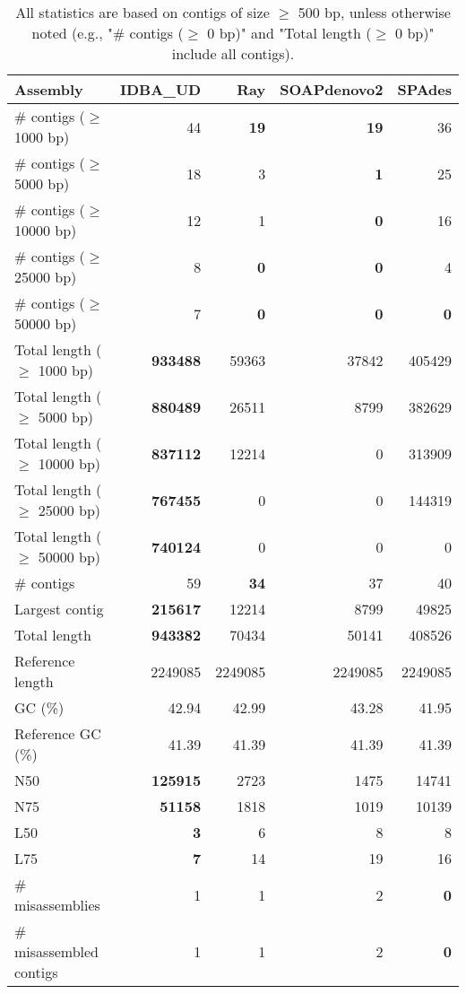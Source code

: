 \documentclass[12pt,a4paper]{article}
\begin{document}
\begin{table}[ht]
\begin{center}
\caption{All statistics are based on contigs of size $\geq$ 500 bp, unless otherwise noted (e.g., "\# contigs ($\geq$ 0 bp)" and "Total length ($\geq$ 0 bp)" include all contigs).}
\begin{tabular}{|l*{4}{|r}|}
\hline
Assembly & IDBA\_UD & Ray & SOAPdenovo2 & SPAdes \\ \hline
\# contigs ($\geq$ 1000 bp) & 44 & {\bf 19} & {\bf 19} & 36 \\ \hline
\# contigs ($\geq$ 5000 bp) & 18 & 3 & {\bf 1} & 25 \\ \hline
\# contigs ($\geq$ 10000 bp) & 12 & 1 & {\bf 0} & 16 \\ \hline
\# contigs ($\geq$ 25000 bp) & 8 & {\bf 0} & {\bf 0} & 4 \\ \hline
\# contigs ($\geq$ 50000 bp) & 7 & {\bf 0} & {\bf 0} & {\bf 0} \\ \hline
Total length ($\geq$ 1000 bp) & {\bf 933488} & 59363 & 37842 & 405429 \\ \hline
Total length ($\geq$ 5000 bp) & {\bf 880489} & 26511 & 8799 & 382629 \\ \hline
Total length ($\geq$ 10000 bp) & {\bf 837112} & 12214 & 0 & 313909 \\ \hline
Total length ($\geq$ 25000 bp) & {\bf 767455} & 0 & 0 & 144319 \\ \hline
Total length ($\geq$ 50000 bp) & {\bf 740124} & 0 & 0 & 0 \\ \hline
\# contigs & 59 & {\bf 34} & 37 & 40 \\ \hline
Largest contig & {\bf 215617} & 12214 & 8799 & 49825 \\ \hline
Total length & {\bf 943382} & 70434 & 50141 & 408526 \\ \hline
Reference length & 2249085 & 2249085 & 2249085 & 2249085 \\ \hline
GC (\%) & 42.94 & 42.99 & 43.28 & 41.95 \\ \hline
Reference GC (\%) & 41.39 & 41.39 & 41.39 & 41.39 \\ \hline
N50 & {\bf 125915} & 2723 & 1475 & 14741 \\ \hline
N75 & {\bf 51158} & 1818 & 1019 & 10139 \\ \hline
L50 & {\bf 3} & 6 & 8 & 8 \\ \hline
L75 & {\bf 7} & 14 & 19 & 16 \\ \hline
\# misassemblies & 1 & 1 & 2 & {\bf 0} \\ \hline
\# misassembled contigs & 1 & 1 & 2 & {\bf 0} \\ \hline

\end{tabular}
\end{center}
\end{table}
\end{document}
